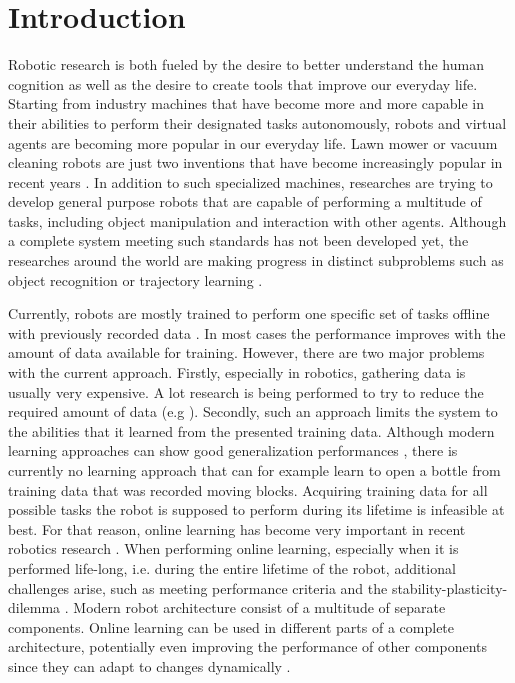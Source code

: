 \chapter{Introduction}

Robotic research is both fueled by the desire to better understand the human cognition as well as the desire to 
create tools that improve our everyday life. Starting from industry machines that have become more and more capable
in their abilities to perform their designated tasks autonomously, robots and virtual agents are becoming 
more popular in our everyday life. Lawn mower or vacuum cleaning robots are just two inventions that have become increasingly popular in recent years \cite{LawnMowerIncrease}. In addition to such specialized machines, researches are trying to develop general purpose robots that are capable of performing a multitude of tasks, including object manipulation and interaction with other agents. Although a complete system meeting such standards has not been developed yet, the researches around the world are making progress in distinct subproblems such as object recognition \cite{HondaObject} or trajectory learning \cite{pancake}.


Currently, robots are mostly trained to perform one specific set of tasks offline with previously recorded data \cite{TODO}. %
In most cases the performance improves with the amount of data available for training. However, there are two major problems with the current approach. Firstly, especially in robotics, gathering data is usually very expensive. A lot research is being performed to try to reduce the required amount of data (e.g \cite{lessData}). Secondly, such an approach limits the system to the abilities that it learned from the presented training data. Although modern learning approaches can show good generalization performances \cite{generalisationPerformance}, there is currently no learning approach that can for example learn to open a bottle from training data that was recorded moving blocks. Acquiring training data for all possible tasks the robot is supposed to perform during its lifetime is infeasible at best. For that reason, online learning has become very important in recent robotics research \cite{list_of_online_learnes}. When performing online learning, especially when it is performed life-long, i.e. during the entire lifetime of the robot, additional challenges arise, such as meeting performance criteria and the stability-plasticity-dilemma \cite{stabilityPlasitcity}. Modern robot architecture consist of a multitude of separate components. Online learning can be used in different parts of a complete architecture, potentially even improving the performance of other components since they can adapt to changes dynamically \cite{Example_for_learning_components}.

